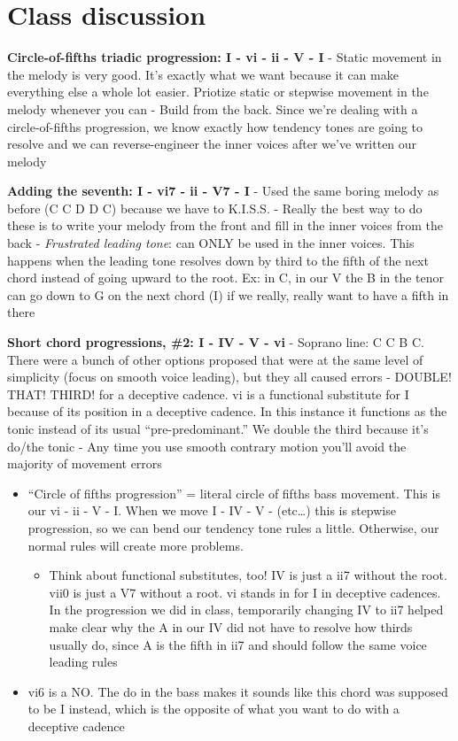 \documentclass{book}
\providecommand{\tightlist}{%
  \setlength{\itemsep}{0pt}\setlength{\parskip}{0pt}}
\begin{document}
\hypertarget{class-discussion-45}{%
\chapter{Class discussion}\label{class-discussion-45}}

\textbf{Circle-of-fifths triadic progression: I - vi - ii - V - I} - Static
movement in the melody is very good. It's exactly what we want because it can
make everything else a whole lot easier. Priotize static or stepwise movement
in the melody whenever you can - Build from the back. Since we're dealing with
a circle-of-fifths progression, we know exactly how tendency tones are going
to resolve and we can reverse-engineer the inner voices after we've written
our melody

\textbf{Adding the seventh: I - vi7 - ii - V7 - I} - Used the same boring
melody as before (C C D D C) because we have to K.I.S.S. - Really the best way
to do these is to write your melody from the front and fill in the inner
voices from the back - \emph{Frustrated leading tone}: can ONLY be used in the
inner voices. This happens when the leading tone resolves down by third to the
fifth of the next chord instead of going upward to the root. Ex: in C, in our
V the B in the tenor can go down to G on the next chord (I) if we really,
really want to have a fifth in there

\textbf{Short chord progressions, \#2: I - IV - V - vi} - Soprano line: C C B
C. There were a bunch of other options proposed that were at the same level of
simplicity (focus on smooth voice leading), but they all caused errors -
DOUBLE! THAT! THIRD! for a deceptive cadence. vi is a functional substitute
for I because of its position in a deceptive cadence. In this instance it
functions as the tonic instead of its usual ``pre-predominant.'' We double the
third because it's do/the tonic - Any time you use smooth contrary motion
you'll avoid the majority of movement errors

\begin{itemize}
\tightlist
\item
  ``Circle of fifths progression'' = literal circle of fifths bass movement.
  This is our vi - ii - V - I. When we move I - IV - V - (etc\ldots) this is
  stepwise progression, so we can bend our tendency tone rules a little.
  Otherwise, our normal rules will create more problems.

  \begin{itemize}
  \tightlist
  \item
    Think about functional substitutes, too! IV is just a ii7 without the
    root. vii0 is just a V7 without a root. vi stands in for I in deceptive
    cadences. In the progression we did in class, temporarily changing IV to
    ii7 helped make clear why the A in our IV did not have to resolve how
    thirds usually do, since A is the fifth in ii7 and should follow the same
    voice leading rules
  \end{itemize}
\item
  vi6 is a NO. The do in the bass makes it sounds like this chord was supposed
  to be I instead, which is the opposite of what you want to do with a
  deceptive cadence
\end{itemize}
\end{document}
